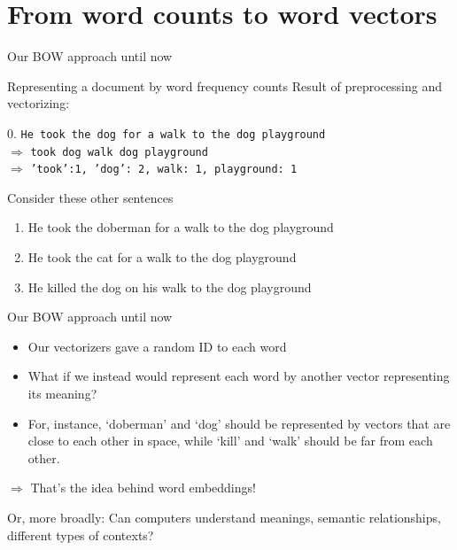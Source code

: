 \section[Word vectors]{From word counts to word vectors}


\begin{frame}{Our BOW approach until now}
  \begin{block}{Representing a document by word frequency counts}
    Result of preprocessing and vectorizing:
    
    0. \texttt{He took the dog for a walk to the dog playground}\\
    $\Rightarrow$ \texttt{took dog walk dog playground}\\
    $\Rightarrow$ \texttt{'took':1, 'dog': 2, walk: 1, playground: 1}
  \end{block}
  
  Consider these other sentences
  \begin{enumerate}
  \item<2-> He took the doberman for a walk to the dog playground
  \item<3-> He took the cat for a walk to the dog playground
  \item<4-> He killed the dog on his walk to the dog playground 
  \end{enumerate}
  
	
\end{frame}


\begin{frame}{Our BOW approach until now}
  \begin{itemize}
  \item Our vectorizers gave a random ID to each word
  \item What if we instead would represent each word by another vector representing its meaning?
  \item For, instance, `doberman' and `dog' should be represented by vectors that are close to each other in space, while `kill' and `walk' should be far from each other.
  \end{itemize}
  \pause
  $\Rightarrow$ That's the idea behind word embeddings!
  
  \pause
  
  Or, more broadly: Can computers understand meanings, semantic relationships, different types of contexts?
\end{frame}


